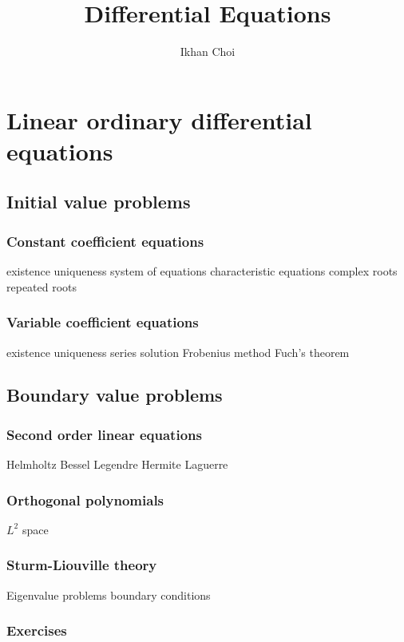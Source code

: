 \documentclass{../note}
\begin{document}
\title{Differential Equations}
\author{Ikhan Choi}
\maketitle
\tableofcontents


\part{Linear ordinary differential equations}


\chapter{Initial value problems}
\section{Constant coefficient equations}
existence uniqueness system of equations
characteristic equations
complex roots
repeated roots


\section{Variable coefficient equations}
existence uniqueness
series solution
Frobenius method
Fuch's theorem




\chapter{Boundary value problems}
\section{Second order linear equations}
Helmholtz
Bessel
Legendre
Hermite
Laguerre

\section{Orthogonal polynomials}
$L^2$ space

\section{Sturm-Liouville theory}
Eigenvalue problems
boundary conditions

\section*{Exercises}
\begin{prb}
\end{prb}
\end{document}
